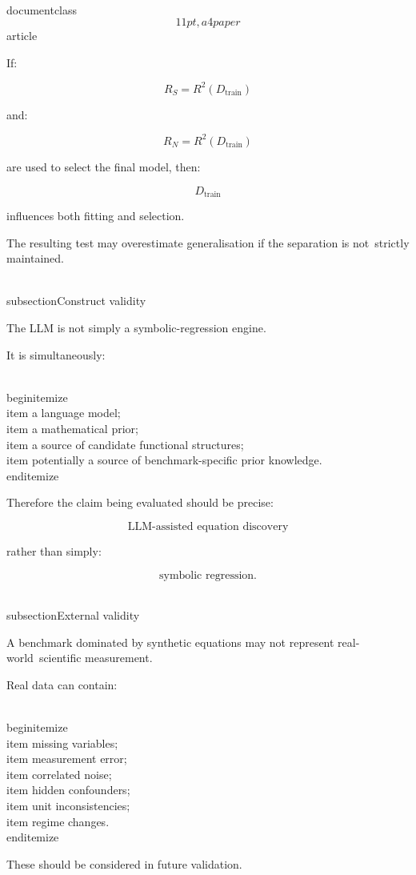 \\documentclass\[11pt,a4paper\]{article}
\begin{document}
 If:

 $$
R_S=R^2(D_{\mathrm{train}})
$$

 and:

 $$
R_N=R^2(D_{\mathrm{train}})
$$

 are used to select the final model, then:

 $$
D_{\mathrm{train}}
$$

 influences both fitting and selection.

 The resulting test may overestimate generalisation if the separation is not\
 strictly maintained.

 \\subsection{Construct validity}

 The LLM is not simply a symbolic-regression engine.

 It is simultaneously:

 \\begin{itemize}\
 \\item a language model;\
 \\item a mathematical prior;\
 \\item a source of candidate functional structures;\
 \\item potentially a source of benchmark-specific prior knowledge.\
 \\end{itemize}

 Therefore the claim being evaluated should be precise:

 $$
\text{LLM-assisted equation discovery}
$$

 rather than simply:

 $$
\text{symbolic regression}.
$$

 \\subsection{External validity}

 A benchmark dominated by synthetic equations may not represent real-world\
 scientific measurement.

 Real data can contain:

 \\begin{itemize}\
 \\item missing variables;\
 \\item measurement error;\
 \\item correlated noise;\
 \\item hidden confounders;\
 \\item unit inconsistencies;\
 \\item regime changes.\
 \\end{itemize}

 These should be considered in future validation.
\end{document}
